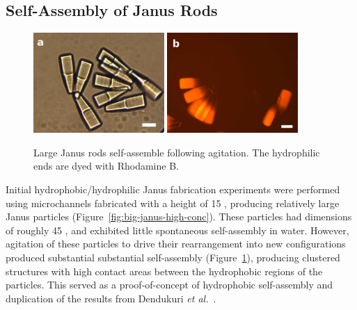 \subsection{Self-Assembly of Janus Rods}
\label{sec:assembly-janus-rods}


\begin{figure}
\begin{center}
\includegraphics[height=1.5in]{figures/rods/large-janus-rods-45x11x11um.jpg}
\includegraphics[height=1.5in]{figures/rods/large-janus-self-assembly.jpg}
\end{center}
\caption{Large Janus rods self-assemble following agitation. The hydrophilic 
ends are dyed with Rhodamine B.}
\label{fig:big-janus-assembly}
\end{figure}

Initial hydrophobic/hydrophilic Janus fabrication experiments 
were performed using microchannels fabricated with a height of 15 \microns, 
producing relatively large Janus particles (Figure~\ref{fig:big-janus-high-conc}). These particles had dimensions 
of roughly 45   \microns, and exhibited little spontaneous self-assembly in water.  However, agitation
of these particles to drive their rearrangement into new configurations produced substantial substantial
self-assembly (Figure~\ref{fig:big-janus-assembly}), producing clustered structures with high contact
areas between the hydrophobic regions of the particles.  This served as a proof-of-concept of 
hydrophobic self-assembly and duplication of the
results from Dendukuri \textit{et al.}~\cite{dendukuri-amph}.  

